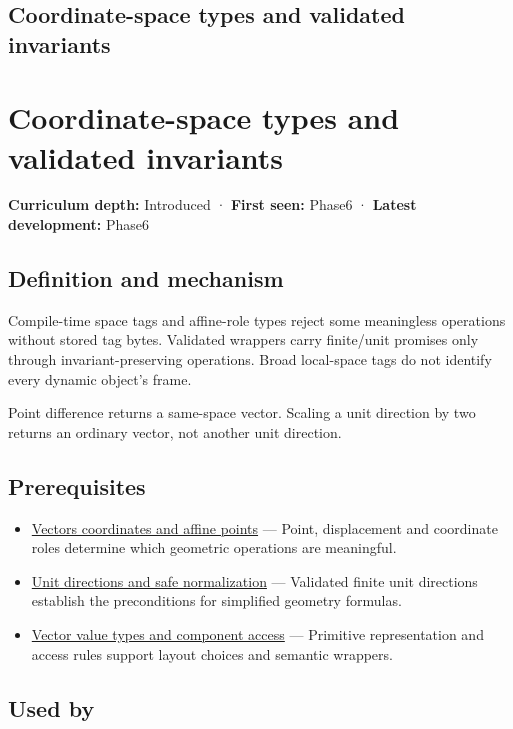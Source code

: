 \hypertarget{appendix-380a220e2529}{}
\section*{Coordinate-space types and validated invariants}
\chapter{Coordinate-space types and validated invariants}\label{appendix-380a220e2529-coordinate-space-types-and-validated-invariants}

\textbf{Curriculum depth:} Introduced · \textbf{First seen:} Phase6 · \textbf{Latest development:} Phase6

\section{Definition and mechanism}\label{appendix-380a220e2529-definition-and-mechanism}

Compile-time space tags and affine-role types reject some meaningless operations without stored tag bytes. Validated wrappers carry finite/unit promises only through invariant-preserving operations. Broad local-space tags do not identify every dynamic object's frame.

Point difference returns a same-space vector. Scaling a unit direction by two returns an ordinary vector, not another unit direction.

\section{Prerequisites}\label{appendix-380a220e2529-prerequisites}

\begin{itemize}
\tightlist
\item
  \hyperref[appendix-0659864c0aa3]{Vectors coordinates and affine points} --- Point, displacement and coordinate roles determine which geometric operations are meaningful.
\item
  \hyperref[appendix-f744e41b95b4]{Unit directions and safe normalization} --- Validated finite unit directions establish the preconditions for simplified geometry formulas.
\item
  \hyperref[appendix-37a39984ba66]{Vector value types and component access} --- Primitive representation and access rules support layout choices and semantic wrappers.
\end{itemize}

\section{Used by}\label{appendix-380a220e2529-used-by}

